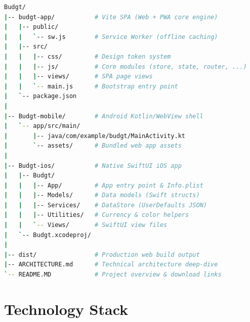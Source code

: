 \documentclass[12pt, a4paper]{article}
\begin{document}
\begin{lstlisting}[language=bash, caption={Top-Level Repository Layout}]
Budgt/
|-- budgt-app/           # Vite SPA (Web + PWA core engine)
|   |-- public/
|   |   `-- sw.js        # Service Worker (offline caching)
|   |-- src/
|   |   |-- css/         # Design token system
|   |   |-- js/          # Core modules (store, state, router, ...)
|   |   |-- views/       # SPA page views
|   |   `-- main.js      # Bootstrap entry point
|   `-- package.json
|
|-- Budgt-mobile/        # Android Kotlin/WebView shell
|   `-- app/src/main/
|       |-- java/com/example/budgt/MainActivity.kt
|       `-- assets/      # Bundled web app assets
|
|-- Budgt-ios/           # Native SwiftUI iOS app
|   |-- Budgt/
|   |   |-- App/         # App entry point & Info.plist
|   |   |-- Models/      # Data models (Swift structs)
|   |   |-- Services/    # DataStore (UserDefaults JSON)
|   |   |-- Utilities/   # Currency & color helpers
|   |   `-- Views/       # SwiftUI view files
|   `-- Budgt.xcodeproj/
|
|-- dist/                # Production web build output
|-- ARCHITECTURE.md      # Technical architecture deep-dive
`-- README.MD            # Project overview & download links
\end{lstlisting}

\section{Technology Stack}
\end{document}
